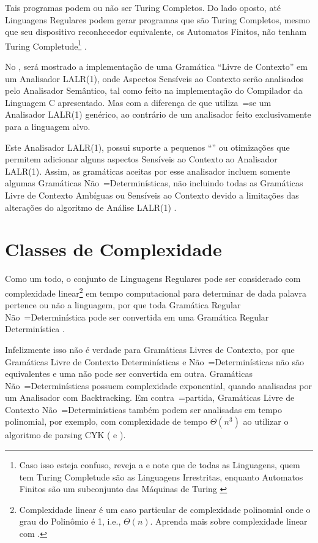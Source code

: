 Tais programas podem ou
não ser Turing Completos.
Do lado oposto,
até Linguagens Regulares podem gerar programas que são Turing Completos,
mesmo que seu dispositivo reconhecedor equivalente,
os Automatos Finitos,
não tenham Turing Completude\footnote{
Caso isso esteja confuso,
reveja a  e
note que de todas as Linguagens,
quem tem Turing Completude são as Linguagens Irrestritas,
enquanto Automatos Finitos são um subconjunto das Máquinas de Turing \cite{finiteAutomataTuringComplete}
}
\cite{turingCompleteRegularLanguages,finiteAutomataTuringComplete}.

No ,
será mostrado a implementação de uma Gramática ``Livre de Contexto'' em um Analisador LALR(1),
onde Aspectos Sensíveis ao Contexto serão analisados pelo Analisador Semântico,
tal como feito na implementação do Compilador da Linguagem C apresentado.
Mas com a diferença de que utiliza~=se um Analisador LALR(1) genérico,
ao contrário de um analisador feito exclusivamente para a linguagem alvo.

Este Analisador LALR(1),
possui suporte a pequenos ``\textit{}'' ou
otimizações que permitem adicionar alguns aspectos Sensíveis ao Contexto ao Analisador LALR(1).
Assim,
as gramáticas aceitas por esse analisador incluem somente algumas Gramáticas Não~=Determinísticas,
não incluindo todas as Gramáticas Livre de Contexto Ambíguas ou
Sensíveis ao Contexto devido a limitações das alterações do algoritmo de Análise LALR(1) \cite{larkContextualLexer}.


\section{Classes de Complexidade}
\label{classesDeComplexidade}

Como um todo,
o conjunto de Linguagens Regulares pode ser considerado com complexidade linear\footnote{
Complexidade linear é um caso particular de complexidade polinomial onde o grau do Polinômio é 1,
i.e.,
$\Theta(n)$.
Aprenda mais sobre complexidade linear com .
}
em tempo computacional para determinar de dada palavra pertence ou
não a linguagem,
por que toda Gramática Regular Não~=Determinística pode ser convertida em uma Gramática Regular Determinística \cite{sipserBook}.

Infelizmente isso não é verdade para Gramáticas Livres de Contexto,
por que Gramáticas Livre de Contexto Determinísticas e
Não~=Determinísticas não são equivalentes e
uma não pode ser convertida em outra.
Gramáticas Não~=Determinísticas possuem complexidade exponential,
quando analisadas por um Analisador com Backtracking.
Em contra~=partida,
Gramáticas Livre de Contexto Não~=Determinísticas também podem ser analisadas em tempo polinomial,
por exemplo,
com complexidade de tempo $\Theta(n^3)$ ao utilizar o algoritmo de parsing CYK ( e
).


